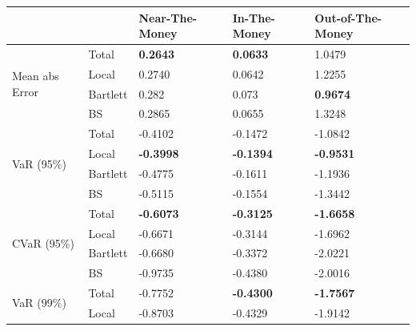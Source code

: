 \documentclass[letterpaper,12pt,titlepage,oneside,final]{book}
\numberwithin{equation}{section}
\theoremstyle{definition}
\begin{document}
\begin{table}[htp!]
	\centering
    \begin{tabular}{ll|l|l|l|}
    \cline{3-5}
                                                          &          & Near-The-Money   & In-The-Money     & Out-of-The-Money \\ \hline
    \multicolumn{1}{|l|}{\multirow{4}{*}{Mean abs Error}} & Total    & \textbf{0.2643}  & \textbf{0.0633}  & 1.0479           \\  
    \multicolumn{1}{|l|}{}                                & Local    & 0.2740           & 0.0642           & 1.2255           \\  
    \multicolumn{1}{|l|}{}                                & Bartlett & 0.282            & 0.073            & \textbf{0.9674}  \\  
    \multicolumn{1}{|l|}{}                                & BS       & 0.2865           & 0.0655           & 1.3248           \\ \hline
    \multicolumn{1}{|l|}{\multirow{4}{*}{VaR (95\%)}}     & Total    & -0.4102          & -0.1472          & -1.0842          \\  
    \multicolumn{1}{|l|}{}                                & Local    & \textbf{-0.3998} & \textbf{-0.1394} & \textbf{-0.9531} \\  
    \multicolumn{1}{|l|}{}                                & Bartlett & -0.4775          & -0.1611          & -1.1936          \\  
    \multicolumn{1}{|l|}{}                                & BS       & -0.5115          & -0.1554          & -1.3442          \\ \hline
    \multicolumn{1}{|l|}{\multirow{4}{*}{CVaR (95\%)}}    & Total    & \textbf{-0.6073} & \textbf{-0.3125} & \textbf{-1.6658} \\  
    \multicolumn{1}{|l|}{}                                & Local    & -0.6671          & -0.3144          & -1.6962          \\  
    \multicolumn{1}{|l|}{}                                & Bartlett & -0.6680          & -0.3372          & -2.0221          \\  
    \multicolumn{1}{|l|}{}                                & BS       & -0.9735          & -0.4380          & -2.0016          \\ \hline
    \multicolumn{1}{|l|}{\multirow{4}{*}{VaR (99\%)}}     & Total    & -0.7752          & \textbf{-0.4300} & \textbf{-1.7567} \\  
    \multicolumn{1}{|l|}{}                                & Local    & -0.8703          & -0.4329          & -1.9142          \\  

\end{tabular}
\end{table}
\end{document}
